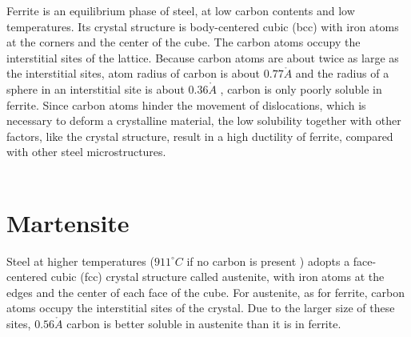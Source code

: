 Ferrite is an equilibrium phase of steel, at low carbon contents and low temperatures. Its crystal structure is body-centered cubic (bcc) with iron atoms at the corners and the center of the cube. The carbon atoms occupy the interstitial sites of the lattice. Because carbon atoms are about twice as large as the interstitial sites, atom radius of carbon is about $0.77  \mathring{A}$ and the radius of a sphere in an interstitial site is about $0.36 \mathring{A}$ \cite{Bleck2016}, carbon is only poorly soluble in ferrite. Since carbon atoms hinder the movement of dislocations, which is necessary to deform a crystalline material, the low solubility together with other factors, like the crystal structure, result in a high ductility of ferrite, compared with other steel microstructures.  \\ \\




\section{Martensite}

Steel at higher temperatures ($911^{\circ}C$ if no carbon is present \cite{Bleck2016}) adopts a face-centered cubic (fcc) crystal structure called austenite, with iron atoms at the edges and the center of each face of the cube. For austenite, as for ferrite, carbon atoms occupy the interstitial sites of the crystal. Due to the larger size of these sites, $0.56\mathring{A}$ \cite{Bleck2016} carbon is better soluble in austenite than it is in ferrite. \\


